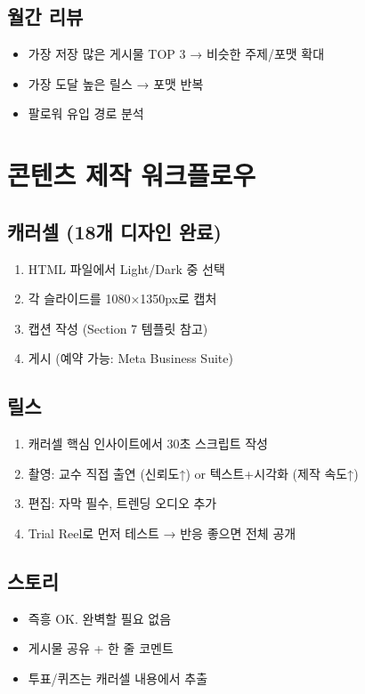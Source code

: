 \documentclass[11pt, a4paper]{article}
\begin{document}
\subsection{월간 리뷰}
\begin{itemize}[leftmargin=2em]
  \item 가장 저장 많은 게시물 TOP 3 → 비슷한 주제/포맷 확대
  \item 가장 도달 높은 릴스 → 포맷 반복
  \item 팔로워 유입 경로 분석
\end{itemize}


\section{콘텐츠 제작 워크플로우}

\subsection{캐러셀 (18개 디자인 완료)}
\begin{enumerate}[leftmargin=2em]
  \item HTML 파일에서 Light/Dark 중 선택
  \item 각 슬라이드를 1080×1350px로 캡처
  \item 캡션 작성 (Section 7 템플릿 참고)
  \item 게시 (예약 가능: Meta Business Suite)
\end{enumerate}

\subsection{릴스}
\begin{enumerate}[leftmargin=2em]
  \item 캐러셀 핵심 인사이트에서 30초 스크립트 작성
  \item 촬영: 교수 직접 출연 (신뢰도↑) or 텍스트+시각화 (제작 속도↑)
  \item 편집: 자막 필수, 트렌딩 오디오 추가
  \item Trial Reel로 먼저 테스트 → 반응 좋으면 전체 공개
\end{enumerate}

\subsection{스토리}
\begin{itemize}[leftmargin=2em]
  \item 즉흥 OK. 완벽할 필요 없음
  \item 게시물 공유 + 한 줄 코멘트
  \item 투표/퀴즈는 캐러셀 내용에서 추출
\end{itemize}
\end{document}
